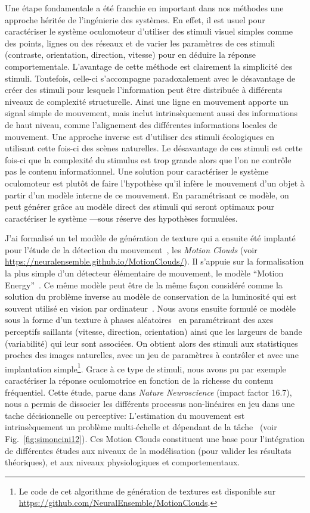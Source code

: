Une étape fondamentale a été franchie en important dans nos méthodes une approche héritée de l'ingénierie des systèmes. En effet, il est usuel pour caractériser le système oculomoteur d'utiliser des stimuli visuel simples comme des points, lignes ou des réseaux et de varier les paramètres de ces stimuli (contraste, orientation, direction, vitesse) pour en déduire la réponse comportementale. L'avantage de cette méthode est clairement la simplicité des stimuli. Toutefois, celle-ci s'accompagne paradoxalement avec le désavantage de créer des stimuli pour lesquels l'information peut être distribuée à différents niveaux de complexité structurelle. Ainsi une ligne en mouvement apporte un signal simple de mouvement, mais inclut intrinsèquement aussi des informations de haut niveau, comme l'alignement des différentes informations locales de mouvement. Une approche inverse est d'utiliser des stimuli écologiques en utilisant cette fois-ci des scènes naturelles. Le désavantage de ces stimuli est cette fois-ci que la complexité du stimulus est trop grande alors que l'on ne contrôle pas le contenu informationnel. Une solution pour caractériser le système oculomoteur est plutôt de faire l'hypothèse qu'il infère le mouvement d'un objet à partir d'un modèle interne de ce mouvement. En paramétrisant ce modèle, on peut générer grâce au modèle direct des stimuli qui seront optimaux pour caractériser le système ---sous réserve des hypothèses formulées. %

J'ai formalisé un tel modèle de génération de texture qui a ensuite été implanté pour l'étude de la détection du mouvement~\citep{Sanz12}, les \emph{Motion Clouds} (voir \url{https://neuralensemble.github.io/MotionClouds/}). Il s'appuie sur la formalisation la plus simple d'un détecteur élémentaire de mouvement, le modèle ``Motion Energy''~\citep{Adelson85}. Ce même modèle peut être de la même façon considéré comme la solution du problème inverse au modèle de conservation de la luminosité qui est souvent utilisé en vision par ordinateur~\citep{Aubert00}. Nous avons ensuite formulé ce modèle sous la forme d'un texture à phases aléatoires~\citep{Galerne10} en paramétrisant des axes perceptifs saillants (vitesse, direction, orientation) ainsi que les largeurs de bande (variabilité) qui leur sont associées.%
On obtient alors des stimuli aux statistiques proches des images naturelles, avec un jeu de paramètres à contrôler et avec une implantation simple\footnote{Le code de cet algorithme de génération de textures est disponible sur \url{https://github.com/NeuralEnsemble/MotionClouds}.}. Grace à ce type de stimuli, nous avons pu par exemple caractériser la réponse oculomotrice en fonction de la richesse du contenu fréquentiel. Cette étude, parue dans \emph{Nature Neuroscience} (impact factor 16.7), nous a permis de dissocier les différents processus non-linéaires en jeu dans une tache décisionnelle ou perceptive: L'estimation du mouvement est intrinsèquement un problème multi-échelle et dépendant de la tâche~\citep{Simoncini12} (voir Fig.~\ref{fig:simoncini12}). Ces Motion Clouds constituent une base pour l'intégration de différentes études aux niveaux de la modélisation (pour valider les résultats théoriques), et aux niveaux physiologiques et comportementaux. %

